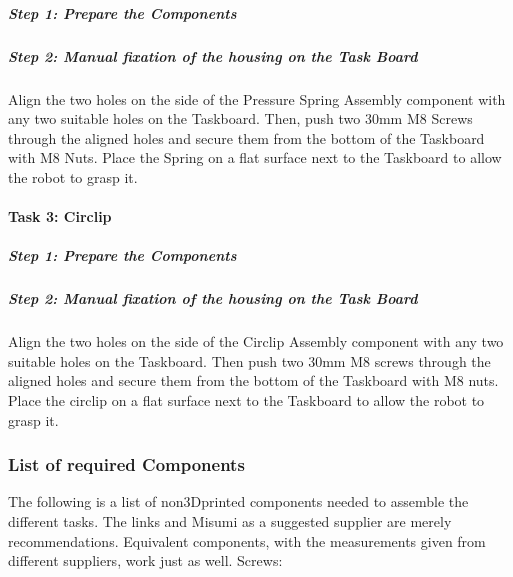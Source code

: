 \documentclass[letterpaper,10pt,english]{sphinxmanual}
\begin{document}
\subparagraph{Step 1: Prepare the Components}
\label{\detokenize{5-Assembly-Instructions-Elastic-Deformation:id1}}

\subparagraph{Step 2: Manual fixation of the housing on the Task Board}
\label{\detokenize{5-Assembly-Instructions-Elastic-Deformation:id2}}
\sphinxAtStartPar
Align the two holes on the side of the Pressure Spring Assembly component with any two suitable holes on the Taskboard. Then, push two 30mm M8 Screws through the aligned holes and secure them from the bottom of the Taskboard with M8 Nuts.
Place the Spring on a flat surface next to the Taskboard to allow the robot to grasp it.


\paragraph{Task 3: Circlip}
\label{\detokenize{5-Assembly-Instructions-Elastic-Deformation:task-3-circlip}}

\subparagraph{Step 1: Prepare the Components}
\label{\detokenize{5-Assembly-Instructions-Elastic-Deformation:id3}}

\subparagraph{Step 2: Manual fixation of the housing on the Task Board}
\label{\detokenize{5-Assembly-Instructions-Elastic-Deformation:id4}}
\sphinxAtStartPar
Align the two holes on the side of the Circlip Assembly component with any two suitable holes on the Taskboard. Then push two 30mm M8 screws through the aligned holes and secure them from the bottom of the Taskboard with M8 nuts.
Place the circlip on a flat surface next to the Taskboard to allow the robot to grasp it.

\sphinxstepscope


\subsubsection{List of required Components}
\label{\detokenize{List-of-Required-Components:list-of-required-components}}\label{\detokenize{List-of-Required-Components::doc}}
\sphinxAtStartPar
The following is a list of non\sphinxhyphen{}3D\sphinxhyphen{}printed components needed to assemble the different tasks.
The links and Misumi as a suggested supplier are merely recommendations. Equivalent components, with the measurements given from different suppliers, work just as well.
Screws:
\end{document}
